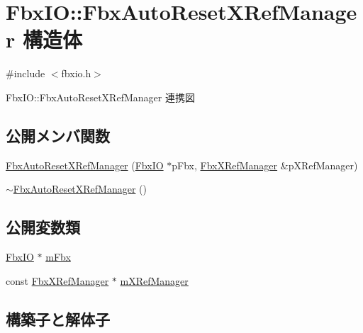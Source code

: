 \hypertarget{struct_fbx_i_o_1_1_fbx_auto_reset_x_ref_manager}{}\section{Fbx\+IO\+:\+:Fbx\+Auto\+Reset\+X\+Ref\+Manager 構造体}
\label{struct_fbx_i_o_1_1_fbx_auto_reset_x_ref_manager}


{\ttfamily \#include $<$fbxio.\+h$>$}



Fbx\+IO\+:\+:Fbx\+Auto\+Reset\+X\+Ref\+Manager 連携図
\subsection*{公開メンバ関数}
\begin{DoxyCompactItemize}
\item 
\hyperlink{struct_fbx_i_o_1_1_fbx_auto_reset_x_ref_manager_a4fd55e4840d236b0afb561001dc2faef}{Fbx\+Auto\+Reset\+X\+Ref\+Manager} (\hyperlink{class_fbx_i_o}{Fbx\+IO} $\ast$p\+Fbx, \hyperlink{class_fbx_x_ref_manager}{Fbx\+X\+Ref\+Manager} \&p\+X\+Ref\+Manager)
\item 
\hyperlink{struct_fbx_i_o_1_1_fbx_auto_reset_x_ref_manager_a7a90d25e3fbad8c2e30bc7a3bd21d702}{$\sim$\+Fbx\+Auto\+Reset\+X\+Ref\+Manager} ()
\end{DoxyCompactItemize}
\subsection*{公開変数類}
\begin{DoxyCompactItemize}
\item 
\hyperlink{class_fbx_i_o}{Fbx\+IO} $\ast$ \hyperlink{struct_fbx_i_o_1_1_fbx_auto_reset_x_ref_manager_a5203c9a88c60e8c6f8a092ec2c84759c}{m\+Fbx}
\item 
const \hyperlink{class_fbx_x_ref_manager}{Fbx\+X\+Ref\+Manager} $\ast$ \hyperlink{struct_fbx_i_o_1_1_fbx_auto_reset_x_ref_manager_a65b41fef18ebe8d10db3dafe69cca132}{m\+X\+Ref\+Manager}
\end{DoxyCompactItemize}


\subsection{構築子と解体子}
\mbox{\label{struct_fbx_i_o_1_1_fbx_auto_reset_x_ref_manager_a4fd55e4840d236b0afb561001dc2faef}} 
